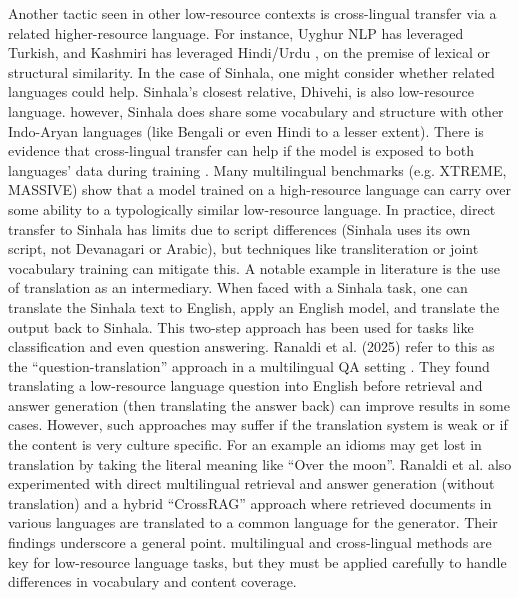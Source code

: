 \documentclass[12pt]{uomthesis}
\begin{document}
Another tactic seen in other low-resource contexts is cross-lingual transfer via a related higher-resource language. For instance, Uyghur NLP has leveraged Turkish, and Kashmiri has leveraged Hindi/Urdu \cite{16}, on the premise of lexical or structural similarity. In the case of Sinhala, one might consider whether related languages could help. Sinhala’s closest relative, Dhivehi, is also low-resource language. however, Sinhala does share some vocabulary and structure with other Indo-Aryan languages (like Bengali or even Hindi to a lesser extent). There is evidence that cross-lingual transfer can help if the model is exposed to both languages’ data during training \cite{2} \cite{17}. Many multilingual benchmarks (e.g. XTREME, MASSIVE) show that a model trained on a high-resource language can carry over some ability to a typologically similar low-resource language. In practice, direct transfer to Sinhala has limits due to script differences (Sinhala uses its own script, not Devanagari or Arabic), but techniques like transliteration or joint vocabulary training can mitigate this. A notable example in literature is the use of translation as an intermediary. When faced with a Sinhala task, one can translate the Sinhala text to English, apply an English model, and translate the output back to Sinhala. This two-step approach has been used for tasks like classification and even question answering. Ranaldi et al. (2025) refer to this as the “question-translation” approach in a multilingual QA setting \cite{18}. They found translating a low-resource language question into English before retrieval and answer generation (then translating the answer back) can improve results in some cases. However, such approaches may suffer if the translation system is weak or if the content is very culture specific. For an example an idioms may get lost in translation by taking the literal meaning like “Over the moon”. Ranaldi et al. also experimented with direct multilingual retrieval and answer generation (without translation) and a hybrid “CrossRAG” approach where retrieved documents in various languages are translated to a common language for the generator. Their findings underscore a general point. multilingual and cross-lingual methods are key for low-resource language tasks, but they must be applied carefully to handle differences in vocabulary and content coverage.
\end{document}

